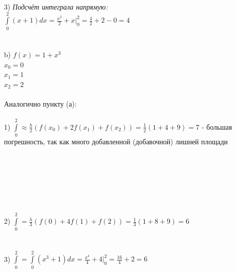\documentclass{article}
\begin{document}
3) \large\textit{Подсчёт интеграла напрямую:}\\
\normalsize
$ \int\limits^2_0 (x + 1)dx = \frac{x^2}{2} + x |^2_0 = \frac{4}{2} + 2 - 0 = 4 $\\
\\\\
\Large b) $ f(x) = 1 + x^3 $\\
\normalsize
$ x_0 = 0 $\\
$ x_1 = 1 $\\
$ x_2 = 2 $\\\\
Аналогично пункту (а):\\\\
1) $ \int\limits^2_0 \approx \frac{h}{2} (f(x_0) + 2f(x_1) + f(x_2)) = \frac{1}{2} (1+4+9) = 7 $ - большая погрешность, так как много добавленной (добавочной) лишней площади\\
\begin{figure}[htb]
\end{figure}\\\\\\\\\\\\
2) $ \int\limits^2_0 = \frac{h}{3} (f(0) + 4f(1) + f(2)) = \frac{1}{3} (1+8+9) = 6 $\\\\\\
3) $ \int\limits^2_0 = \int\limits^2_0 (x^3 + 1)dx = \frac{x^4}{4} + 4 |^2_0 = \frac{16}{4} + 2 = 6 $\\
\end{document}
